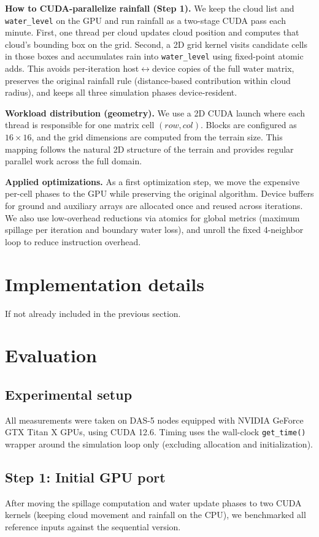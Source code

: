 \documentclass[sigconf, nonacm, review]{acmart}
\begin{document}
\textbf{How to CUDA-parallelize rainfall (Step 1).}
We keep the cloud list and \texttt{water\_level} on the GPU and run rainfall as a two-stage CUDA pass each minute. First, one thread per cloud updates cloud position and computes that cloud's bounding box on the grid. Second, a 2D grid kernel visits candidate cells in those boxes and accumulates rain into \texttt{water\_level} using fixed-point atomic adds. This avoids per-iteration host$\leftrightarrow$device copies of the full water matrix, preserves the original rainfall rule (distance-based contribution within cloud radius), and keeps all three simulation phases device-resident.

\textbf{Workload distribution (geometry).}
We use a 2D CUDA launch where each thread is responsible for one matrix cell $(row,col)$. Blocks are configured as $16\times16$, and the grid dimensions are computed from the terrain size. This mapping follows the natural 2D structure of the terrain and provides regular parallel work across the full domain.

\textbf{Applied optimizations.}
As a first optimization step, we move the expensive per-cell phases to the GPU while preserving the original algorithm. Device buffers for ground and auxiliary arrays are allocated once and reused across iterations. We also use low-overhead reductions via atomics for global metrics (maximum spillage per iteration and boundary water loss), and unroll the fixed 4-neighbor loop to reduce instruction overhead.

\section{Implementation details}
If not already included in the previous section.

\section{Evaluation}

\subsection{Experimental setup}
All measurements were taken on DAS-5 nodes equipped with NVIDIA GeForce GTX Titan X GPUs, using CUDA 12.6. Timing uses the wall-clock \texttt{get\_time()} wrapper around the simulation loop only (excluding allocation and initialization).

\subsection{Step 1: Initial GPU port}
After moving the spillage computation and water update phases to two CUDA kernels (keeping cloud movement and rainfall on the CPU), we benchmarked all reference inputs against the sequential version.
\end{document}
